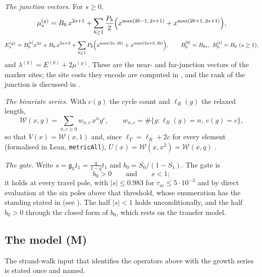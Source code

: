 \documentclass[11pt]{article}
\theoremstyle{plain}
\theoremstyle{definition}
\theoremstyle{remark}
\theoremstyle{plain}\newtheorem*{maintheorem}{Main Theorem}
\begin{document}
\emph{The junction vectors.} For $s\ge0$,
\begin{equation}\label{eq:junctionsym}
   \mu^{(y)}_s=B_0\,x^{2s+1}+\sum_{b\ge1}\frac{P_b}{2}
   \Bigl(x^{\max(2b-1,\,2s+1)}+x^{\max(2b+1,\,2s+1)}\Bigr),
\end{equation}
\begin{equation}\label{eq:farjunction}
   E^{(y)}_s=B_0^{[s]}x^{2s}+B_0\,x^{2s+2}+\sum_{b\ge1}P_b
   \Bigl(x^{\max(2s,\,2b)}+x^{\max(2s+2,\,2b)}\Bigr),\qquad
   B_0^{[0]}=B_{0z},\ B_0^{[s]}=B_0\ (s\ge1),
\end{equation}
and $\lambda^{(y)}=E^{(y)}+2\mu^{(y)}$. These are the near- and far-junction vectors of the marker
sites; the site costs they encode are computed in
\cite[Corollary ``the marker junctions'', \textup{cor:marker}]{Bonfioli2026bB}, and the rank of the
junction is discussed in \cite[Proposition ``the marker junction is not rank one'',
\textup{prop:junction}]{Bonfioli2026bB}.

\emph{The bivariate series.} With $c(g)$ the cycle count and $\ell_R(g)$ the relaxed length,
\[
   \mathcal W(x,y)=\sum_{n,c\ge0}w_{n,c}\,x^ny^c,\qquad
   w_{n,c}=\#\{g:\ell_R(g)=n,\ c(g)=c\},
\]
so that $V(x)=\mathcal W(x,1)$ and, since $\ell_T=\ell_R+2c$ for every element (formalised in Lean,
\texttt{metricAll}), $U(x)=\mathcal W(x,x^2)=\mathcal W(x,q)$
\cite[\S\,\textup{sec:bridge}]{Bonfioli2026bB}.

\emph{The gate.} Write $s=\mathfrak g_Vt_1=\tfrac q{1-q}t_1$ and $b_0=S_0/(1-S_1)$. The gate is
\begin{equation}\label{eq:gate}
   b_0>0\qquad\text{and}\qquad s<1 ;
\end{equation}
it holds at every travel pole, with $|s|\le0.983$ for $\tau_m\le5\cdot10^{-3}$ and by direct
evaluation at the six poles above that threshold, whose enumeration has the standing stated in
\cite[Theorem ``the amplitude estimate $(\star)$'', \textup{thm:star}]{Bonfioli2026bB}
\textup{(}see \cite[Corollary ``the gate closes'', \textup{app:gate}]{Bonfioli2026bB}\textup{)}. The half $|s|<1$
holds unconditionally, and the half $b_0>0$ through the closed form of $b_0$, which rests on the
transfer model.

\subsection{The model \textup{(M)}}

The strand-walk input that identifies the operators above with the growth series is stated once and
named.
\end{document}
